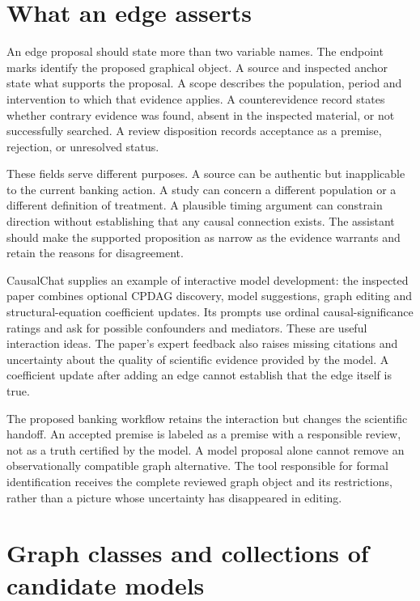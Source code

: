 \section{What an edge asserts}

An edge proposal should state more than two variable names. The endpoint
marks identify the proposed graphical object. A source and inspected anchor
state what supports the proposal. A scope describes the population, period
and intervention to which that evidence applies. A counterevidence record
states whether contrary evidence was found, absent in the inspected material,
or not successfully searched. A review disposition records acceptance as a
premise, rejection, or unresolved status.

These fields serve different purposes. A source can be authentic but
inapplicable to the current banking action. A study can concern a different
population or a different definition of treatment. A plausible timing argument
can constrain direction without establishing that any causal connection
exists. The assistant should make the supported proposition as narrow as
the evidence warrants and retain the reasons for disagreement.

CausalChat supplies an example of interactive model development: the inspected
paper combines optional CPDAG discovery, model suggestions, graph editing
and structural-equation coefficient updates. Its prompts use ordinal
causal-significance ratings and ask for possible confounders and mediators.
These are useful interaction ideas. The paper's expert feedback also raises
missing citations and uncertainty about the quality of scientific evidence
provided by the model. A coefficient update after adding an edge cannot
establish that the edge itself is true.\cite{v12_la_2410_14146}

The proposed banking workflow retains the interaction but changes the
scientific handoff. An accepted premise is labeled as a premise with a
responsible review, not as a truth certified by the model. A model proposal
alone cannot remove an observationally compatible graph alternative. The
tool responsible for formal identification receives the complete reviewed
graph object and its restrictions, rather than a picture whose uncertainty
has disappeared in editing.

\section{Graph classes and collections of candidate models}

